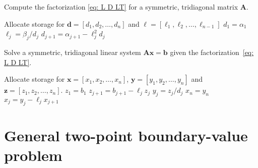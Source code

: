 \begin{algorithm}
\caption{Compute the factorization \eqref{eq: L D LT} for a symmetric, 
tridiagonal matrix $\boldsymbol{A}$.}
\label{alg: LDLT}
\begin{algorithmic}
\Statex
{}
\State Allocate storage for $\boldsymbol{d}=[d_1,d_2,\ldots, d_n]$ and
$\boldsymbol{\ell}=[\ell_1,\ell_2,\ldots,\ell_{n-1}]$
\State $d_1=\alpha_1$
\State $\ell_j=\beta_j/d_j$
\State $d_{j+1}=\alpha_{j+1}-\ell_j^2d_j$
\EndFor
\State{}
\EndFunction
\end{algorithmic}
\end{algorithm}

\begin{algorithm}
\caption{Solve a symmetric, tridiagonal linear system 
$\boldsymbol{A}\boldsymbol{x}=\boldsymbol{b}$ given the 
factorization~\eqref{eq: L D LT}.}
\label{alg: solve symmetric tridiagonal}
\begin{algorithmic}
\Statex
{}
\State Allocate storage for $\boldsymbol{x}=[x_1,x_2,\ldots,x_n]$,
$\boldsymbol{y}=[y_1,y_2,\ldots,y_n]$ and $\boldsymbol{z}=[z_1,z_2,\ldots,z_n]$.
\State $z_1=b_1$
\State $z_{j+1}=b_{j+1}-\ell_jz_j$
\EndFor
{}
\State $y_j=z_j/d_j$
\EndFor
\State $x_n=y_n$
\State $x_j=y_j-\ell_jx_{j+1}$
\EndFor
\State{}
\EndFunction
\end{algorithmic}
\end{algorithm}

\section{General two-point boundary-value problem}

